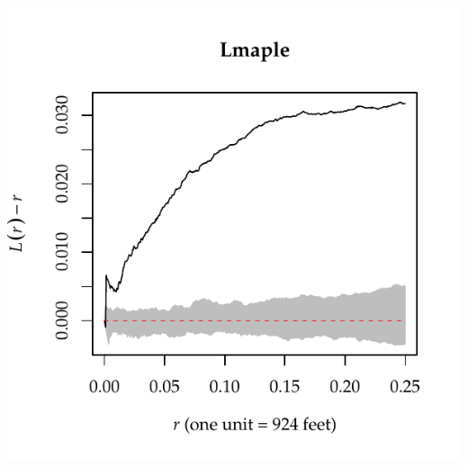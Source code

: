 \documentclass{article}\usepackage[]{graphicx}\usepackage[]{color}
\makeatletter
\def\maxwidth{ %
  \ifdim\Gin@nat@width>\linewidth
    \linewidth
  \else
    \Gin@nat@width
  \fi
}
\newenvironment{knitrout}{}{} %
\makeatother
\begin{document}
\begin{enumerate}
\begin{enumerate}
\begin{knitrout}
{\centering \includegraphics[width=\maxwidth]{figure/prob3c-2} 

}



\end{knitrout}
\end{enumerate}
\end{enumerate}
\end{document}
